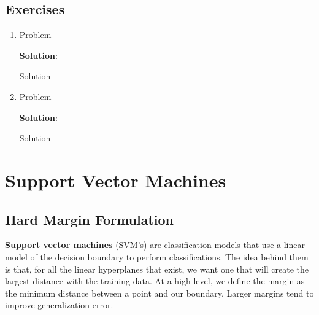 \documentclass[11pt, letterpaper]{article}
\theoremstyle{definition}
\theoremstyle{plain}
\newenvironment{solution}{
    \vspace{2mm}
    \color{blue}\noindent\textbf{Solution}:
}{}
\begin{document}
\subsection{Exercises}

\begin{mdframed}
    \begin{enumerate}
        \item Problem
        
        \begin{solution}
            Solution
        \end{solution}

        \item Problem
        
        \begin{solution}
            Solution
        \end{solution}
    \end{enumerate}
\end{mdframed}

\section{Support Vector Machines}

\subsection{Hard Margin Formulation}
\textbf{Support vector machines} (SVM's) are classification models that use a linear model of the decision boundary to perform classifications. The idea behind them is that, for all the linear hyperplanes that exist, we want one that will create the largest distance with the training data. At a high level, we define the margin as the minimum distance between a point and our boundary. Larger margins tend to improve generalization error.
\end{document}
